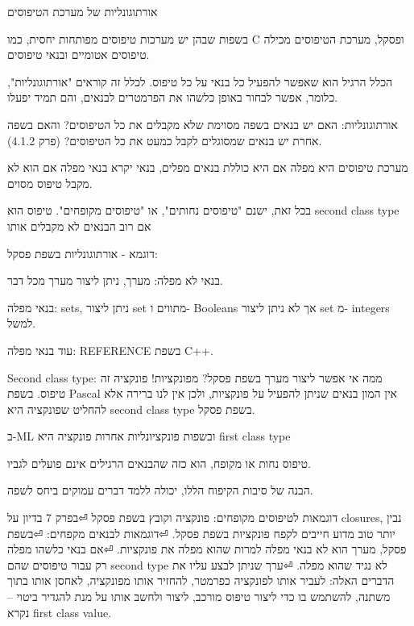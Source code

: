       אורתוגונליות של מערכת הטיפוסים
      \begin{ציינון}
\item בשפות שבהן יש
      מערכות טיפוסים
      מפותחות יחסית, כמו
      C ופסקל, מערכת
      הטיפוסים מכילה
      טיפוסים אטומיים
      ובנאי טיפוסים.
\item 
      הכלל הרגיל הוא
      שאפשר להפעיל כל
      בנאי על כל טיפוס.
      לכלל זה קוראים
      "אורתוגונליות",
      כלומר, אפשר לבחור
      באופן כלשהו את
      הפרמטרים לבנאים,
      והם תמיד יפעלו.
\item אורתוגונליות: האם יש בנאים בשפה מסוימת שלא מקבלים את כל הטיפוסים? והאם בשפה אחרת יש בנאים שמסוגלים לקבל כמעט את כל הטיפוסים? (פרק 4.1.2).
\item מערכת טיפוסים היא מפלה אם היא כוללת בנאים מפלים, בנאי יקרא בנאי מפלה אם הוא לא מקבל טיפוס מסוים.
\item בכל זאת, ישנם "טיפוסים נחותים", או "טיפוסים מקופחים". טיפוס הוא second class type אם רוב הבנאים לא מקבלים אותו
\item דוגמא - אורתוגונליות בשפת פסקל:
\item בנאי לא מפלה: מערך, ניתן ליצור מערך מכל דבר.
\item בנאי מפלה: sets, ניתן ליצור set מתווים ו- Booleans אך לא ניתן ליצור set מ- integers למשל.
\item עוד בנאי מפלה: REFERENCE בשפת C++.
\item Second class type: ממה אי אפשר ליצור מערך בשפת פסקל? מפונקציות! פונקציה זה טיפוס. בשפת Pascal אין המון בנאים שניתן להפעיל על פונקציות, ולכן אין לנו ברירה אלא להחליט שפונקציה היא second class type בשפת פסקל.
\item ב-ML ובשפות פונקציונליות אחרות פונקציה היא first class type
\item טיפוס נחות או מקופח, הוא כזה שהבנאים הרגילים אינם פועלים לגביו.
\item הבנה של סיבות הקיפוח הללו, יכולה ללמד דברים עמוקים ביחס לשפה.
\item דוגמאות לטיפוסים מקופחים: פונקציה וקובץ בשפת פסקל
⏎בפרק 7 בדיון על closures, נבין יותר טוב מדוע חייבים לקפח פונקציות בשפת פסקל.
⏎דוגמאות לבנאים מקפחים:
⏎בשפת פסקל, מערך הוא לא בנאי מפלה למרות שהוא מפלה את פונקציות.
⏎אם בנאי כלשהו מפלה רק עבור טיפוסים שהם second type לא נגיד שהוא מפלה.
⏎ערך שניתן לבצע עליו את הדברים האלה: לעביר אותו לפונקציה כפרמטר, להחזיר אותו מפונקציה, לאחסן אותו בתוך משתנה, להשתמש בו כדי ליצור טיפוס מורכב, ליצור ולחשב אותו על מנת להגדיר ביטוי – נקרא first class value.
    \end{ציינון}

